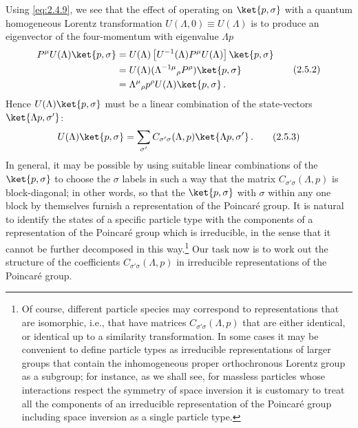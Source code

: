 Using \eqref{eq:2.4.9}, we see that the effect of operating on $\ket{p,\sigma}$ with a
quantum homogeneous Lorentz transformation $U(\Lambda,0)\equiv U(\Lambda)$ is
to produce an eigenvector of the four-momentum with eigenvalue $\Lambda p$
\begin{equation}
\begin{aligned}
P^\mu U(\Lambda)\ket{p,\sigma}
&=U(\Lambda)\left[U^{-1}(\Lambda)P^\mu U(\Lambda)\right]\ket{p,\sigma}\\
&=U(\Lambda)(\Lambda^{-1\mu}{}_{\rho}P^\rho)\ket{p,\sigma}\\
&=\Lambda^\mu{}_{\rho}p^\rho U(\Lambda)\ket{p,\sigma}\,.
\end{aligned}
\tag{2.5.2}\label{eq:2.5.2}
\end{equation}
Hence $U(\Lambda)\ket{p,\sigma}$ must be a linear combination of the
state-vectors $\ket{\Lambda p,\sigma'}$:
\begin{equation}
U(\Lambda)\ket{p,\sigma}
=\sum_{\sigma'}C_{\sigma'\sigma}(\Lambda,p)
\ket{\Lambda p,\sigma'}\,.
\tag{2.5.3}\label{eq:2.5.3}
\end{equation}
In general, it may be possible by using suitable linear combinations of the
$\ket{p,\sigma}$ to choose the $\sigma$ labels in such a way that the matrix
$C_{\sigma'\sigma}(\Lambda,p)$ is block-diagonal; in other words, so that the
$\ket{p,\sigma}$ with $\sigma$ within any one block by themselves furnish a
representation of the Poincar\'e group. It is natural to identify
the states of a specific particle type with the components of a representation
of the Poincar\'e group which is irreducible, in the sense that it
cannot be further decomposed in this way.\footnote{Of course, different
particle species may correspond to representations that are isomorphic, i.e.,
that have matrices $C_{\sigma'\sigma}(\Lambda,p)$ that are either identical, or
identical up to a similarity transformation. In some cases it may be convenient
to define particle types as irreducible representations of larger groups that
contain the inhomogeneous proper orthochronous Lorentz group as a subgroup; for
instance, as we shall see, for massless particles whose interactions respect
the symmetry of space inversion it is customary to treat all the components of
an irreducible representation of the Poincar\'e group including
space inversion as a single particle type.} Our task now is to work out the
structure of the coefficients $C_{\sigma'\sigma}(\Lambda,p)$ in irreducible
representations of the Poincar\'e group.

